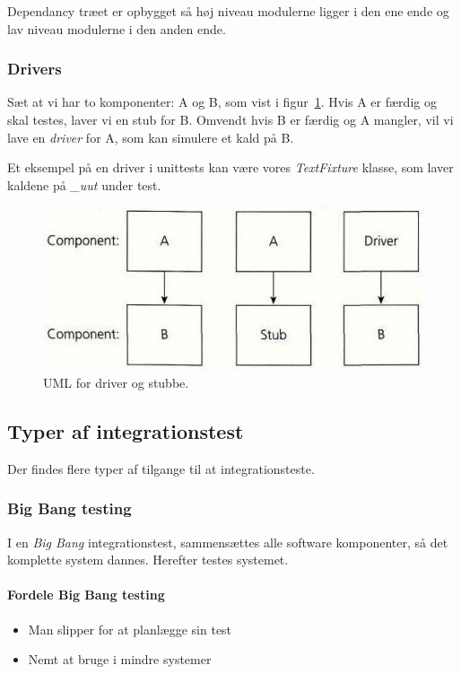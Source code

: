 Dependancy træet er opbygget så høj niveau modulerne ligger i den ene ende og lav niveau modulerne i den anden ende.

\subsubsection{Drivers}

Sæt at vi har to komponenter: A og B, som vist i figur~\ref{fig:driver}. Hvis A er færdig og skal testes, laver vi en stub for B. 
Omvendt hvis B er færdig og A mangler, vil vi lave en \textit{driver} for A, som kan simulere et kald på B.

Et eksempel på en driver i unittests kan være vores \textit{TextFixture} klasse, som laver kaldene på \textit{\_uut} under test.

\begin{figure}[H]
\centering
\includegraphics[width=0.7\linewidth]{figs/driver}
\caption{UML for driver og stubbe.}
\label{fig:driver}
\end{figure}

\subsection{Typer af integrationstest}
Der findes flere typer af tilgange til at integrationsteste.

\subsubsection{Big Bang testing}
I en \textit{Big Bang} integrationstest, sammensættes alle software komponenter, så det komplette system dannes. Herefter testes systemet.

\paragraph{Fordele Big Bang testing}
\begin{itemize}
	\item Man slipper for at planlægge sin test
	\item Nemt at bruge i mindre systemer
\end{itemize}

